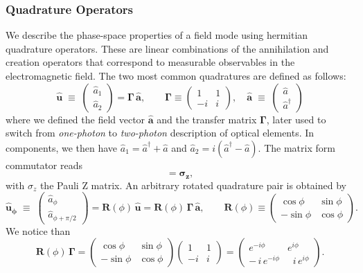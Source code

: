 \subsubsection{Quadrature Operators}
We describe the phase-space properties of a field mode using hermitian quadrature operators. These are linear combinations of the annihilation and creation operators that correspond to measurable observables in the electromagnetic field. The two most common quadratures are defined as follows:
\begin{equation}
\mathbf{\hat{u}}\;\equiv\;
\begin{pmatrix}\hat a_1\\[2pt]\hat a_2\end{pmatrix}
=\mathbf\Gamma \, \mathbf{\hat{a}}, \label{II.2}
\qquad
\mathbf \Gamma \equiv
\begin{pmatrix}
1 & 1 \\
-i & i
\end{pmatrix},
\quad
\mathbf{\hat{a}}\;\equiv\;
\begin{pmatrix}\hat a\\ \hat a^\dagger\end{pmatrix}
\end{equation}
where we defined the field vector $\mathbf{\hat{a}}$ and the transfer matrix $\mathbf \Gamma$, later used to switch from \textit{one-photon} to \textit{two-photon} description of optical elements. In components, we then have $\hat a_1=\hat a^\dagger+\hat a$ and $\hat a_2=i(\hat a^\dagger-\hat a)$.
The matrix form commutator reads
\begin{equation}
[\mathbf{\hat{a}}, \mathbf{\hat{a}}^{\dagger}] = \mathbf{\sigma_z}, 
\end{equation}
with $\sigma_z$ the Pauli Z matrix. 
An arbitrary rotated quadrature pair is obtained by
\begin{equation}
\mathbf{\hat{u}_\phi}\;\equiv\;
\begin{pmatrix}\hat a_\phi\\[2pt]\hat a_{\phi+\pi/2}\end{pmatrix}
= \mathbf R(\phi)\,\mathbf{\hat{u}}
= \mathbf R(\phi)\,\mathbf\Gamma \,\mathbf{\hat{a}},
\qquad
 \mathbf R(\phi)\equiv
\begin{pmatrix}
\cos\phi & \sin\phi \\
-\sin\phi & \cos\phi \label{II.4}
\end{pmatrix}.
\end{equation}
We notice than 
\begin{equation}
\mathbf R(\phi)\,\boldsymbol{\Gamma}
=
\begin{pmatrix}
\cos\phi & \sin\phi \\
-\sin\phi & \cos\phi
\end{pmatrix}
\begin{pmatrix}
1 & 1 \\
-i & i
\end{pmatrix}
=
\begin{pmatrix}
e^{-i\phi} & e^{i\phi} \\[4pt]
-\,i\,e^{-i\phi} & \;\;i\,e^{i\phi}
\end{pmatrix}.
\end{equation}
